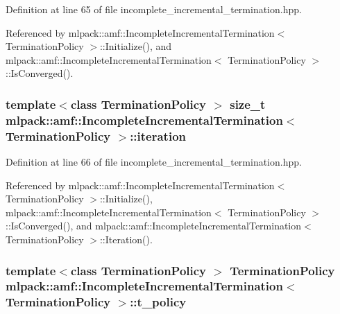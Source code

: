 Definition at line 65 of file incomplete\-\_\-incremental\-\_\-termination.\-hpp.



Referenced by mlpack\-::amf\-::\-Incomplete\-Incremental\-Termination$<$ Termination\-Policy $>$\-::\-Initialize(), and mlpack\-::amf\-::\-Incomplete\-Incremental\-Termination$<$ Termination\-Policy $>$\-::\-Is\-Converged().

\subsubsection[{iteration}]{\setlength{\rightskip}{0pt plus 5cm}template$<$class Termination\-Policy $>$ size\-\_\-t {\bf mlpack\-::amf\-::\-Incomplete\-Incremental\-Termination}$<$ Termination\-Policy $>$\-::iteration\hspace{0.3cm}{\ttfamily [private]}}\label{classmlpack_1_1amf_1_1IncompleteIncrementalTermination_a42f846ef9926a4dcdd6d8fa2f69abd51}


Definition at line 66 of file incomplete\-\_\-incremental\-\_\-termination.\-hpp.



Referenced by mlpack\-::amf\-::\-Incomplete\-Incremental\-Termination$<$ Termination\-Policy $>$\-::\-Initialize(), mlpack\-::amf\-::\-Incomplete\-Incremental\-Termination$<$ Termination\-Policy $>$\-::\-Is\-Converged(), and mlpack\-::amf\-::\-Incomplete\-Incremental\-Termination$<$ Termination\-Policy $>$\-::\-Iteration().

\subsubsection[{t\-\_\-policy}]{\setlength{\rightskip}{0pt plus 5cm}template$<$class Termination\-Policy $>$ Termination\-Policy {\bf mlpack\-::amf\-::\-Incomplete\-Incremental\-Termination}$<$ Termination\-Policy $>$\-::t\-\_\-policy\hspace{0.3cm}{\ttfamily [private]}}\label{classmlpack_1_1amf_1_1IncompleteIncrementalTermination_ad8a69e55fb2b57bb2664a0c43e5cadc9}


